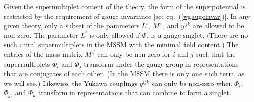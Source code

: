 \documentclass[11pt]{article}
\begin{document}
Given the supermultiplet content of the theory, the form of the
superpotential is restricted by the requirement of gauge invariance [see
eq.~(\ref{wgaugeinvar})].  In any given theory, only a subset of the
parameters $L^i$, $M^{ij}$, and $y^{ijk}$ are allowed to be non-zero.  The
parameter $L^i$ is only allowed if $\Phi_i$ is a gauge singlet. (There are
no such chiral supermultiplets in the MSSM with the minimal field
content.) The entries of the mass matrix $M^{ij}$ can only be non-zero for
$i$ and $j$ such that the supermultiplets $\Phi_i$ and $\Phi_j$ transform
under the gauge group in representations that are conjugates of each
other. (In the MSSM there is only one such term, as we will see.)
Likewise, the Yukawa couplings $y^{ijk}$ can only be non-zero when
$\Phi_i$, $\Phi_j$, and $\Phi_k$ transform in representations that can
combine to form a singlet. 
\end{document}
